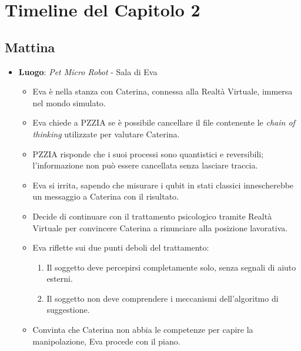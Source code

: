 
\section*{Timeline del Capitolo 2}

\subsection*{Mattina}

\begin{itemize}
    \item \textbf{Luogo}: \emph{Pet Micro Robot} - Sala di Eva
    \begin{itemize}
        \item Eva è nella stanza con Caterina, connessa alla Realtà Virtuale, immersa nel mondo simulato.
        \item Eva chiede a PZZIA se è possibile cancellare il file contenente le \textit{chain of thinking} utilizzate per valutare Caterina.
        \item PZZIA risponde che i suoi processi sono quantistici e reversibili; l'informazione non può essere cancellata senza lasciare traccia.
        \item Eva si irrita, sapendo che misurare i qubit in stati classici innescherebbe un messaggio a Caterina con il risultato.
        \item Decide di continuare con il trattamento psicologico tramite Realtà Virtuale per convincere Caterina a rinunciare alla posizione lavorativa.
        \item Eva riflette sui due punti deboli del trattamento:
        \begin{enumerate}
            \item Il soggetto deve percepirsi completamente solo, senza segnali di aiuto esterni.
            \item Il soggetto non deve comprendere i meccanismi dell'algoritmo di suggestione.
        \end{enumerate}
        \item Convinta che Caterina non abbia le competenze per capire la manipolazione, Eva procede con il piano.
    \end{itemize}
    

\end{itemize}
